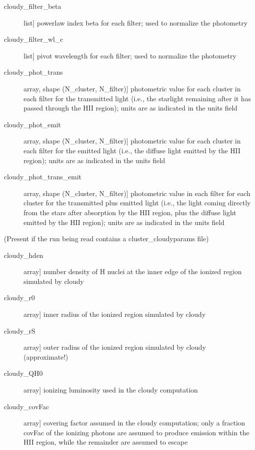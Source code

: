 \documentclass[letterpaper,10pt,english]{sphinxmanual}
\begin{document}
\begin{fulllineitems}
\begin{description}
\begin{description}
\item[{cloudy\_filter\_beta}] \leavevmode{[}list{]}
powerlaw index beta for each filter; used to normalize the
photometry

\item[{cloudy\_filter\_wl\_c}] \leavevmode{[}list{]}
pivot wavelength for each filter; used to normalize the photometry

\item[{cloudy\_phot\_trans}] \leavevmode{[}array, shape (N\_cluster, N\_filter){]}
photometric value for each cluster in each filter for the
transmitted light (i.e., the starlight remaining after it has
passed through the HII region); units are as indicated in
the units field

\item[{cloudy\_phot\_emit}] \leavevmode{[}array, shape (N\_cluster, N\_filter){]}
photometric value for each cluster in each filter for the
emitted light (i.e., the diffuse light emitted by the HII
region); units are as indicated in the units field

\item[{cloudy\_phot\_trans\_emit}] \leavevmode{[}array, shape (N\_cluster, N\_filter){]}
photometric value in each filter for each cluster for the
transmitted plus emitted light (i.e., the light coming
directly from the stars after absorption by the HII region,
plus the diffuse light emitted by the HII region); units are as
indicated in the units field

\end{description}

(Present if the run being read contains a cluster\_cloudyparams file)
\begin{description}
\item[{cloudy\_hden}] \leavevmode{[}array{]}
number density of H nuclei at the inner edge of the ionized
region simulated by cloudy

\item[{cloudy\_r0}] \leavevmode{[}array{]}
inner radius of the ionized region simulated by cloudy

\item[{cloudy\_rS}] \leavevmode{[}array{]}
outer radius of the ionized region simulated by cloudy (approximate!)

\item[{cloudy\_QH0}] \leavevmode{[}array{]}
ionizing luminosity used in the cloudy computation

\item[{cloudy\_covFac}] \leavevmode{[}array{]}
covering factor assumed in the cloudy computation; only a
fraction covFac of the ionizing photons are assumed to
produce emission within the HII region, while the remainder
are assumed to escape


\end{description}
\end{description}
\end{fulllineitems}
\end{document}
